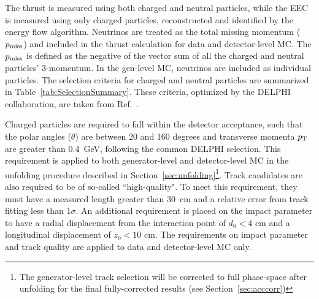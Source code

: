 \documentclass[a4paper,11pt]{article}
\begin{document}
The thrust is measured using both charged and neutral particles, while the EEC is measured using only charged particles, reconstructed and identified by the energy flow algorithm. 
Neutrinos are treated as the total missing momentum ($p_{\rm miss}$) and included in the thrust calculation for data and detector-level MC. 
The $p_{\rm miss}$ is defined as the negative of the vector sum of all the charged and neutral particles' 3-momentum. 
In the gen-level MC, neutrinos are included as individual particles. 
The selection criteria for charged and neutral particles are summarized in Table~\ref{tab:SelectionSummary}. These criteria, optimized by the DELPHI collaboration, are taken from Ref.~\cite{DELPHI:2003yqh}.

Charged particles are required to fall within the detector acceptance, such that the polar angles ($\theta$) are between 20 and 160 degrees and transverse momenta $p_{\rm T}$ are greater than 0.4~GeV, following the common DELPHI selection. This requirement is applied to both generator-level and detector-level MC in the unfolding procedure described in Section~\ref{sec:unfolding}\footnote{The generator-level track selection will be corrected to full phase-space after unfolding for the final fully-corrected results (see Section~\ref{sec:acccorr})}. Track candidates are also required to be of so-called ``high-quality". To meet this requirement, they must have a measured length greater than 30~cm and a relative error from track fitting less than 1$\sigma$. An additional requirement is placed on the impact parameter to have a radial displacement from the interaction point of $d_{0} <4$ cm and a longitudinal displacement of $z_{0}<10$ cm. The requirements on impact parameter and track quality are applied to data and detector-level MC only. 
\end{document}
